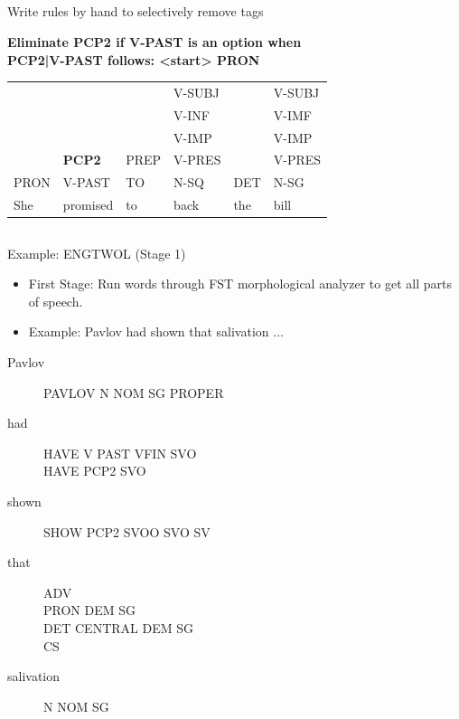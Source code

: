 \documentclass[9pt,xcolor=pdftex,dvipsnames,table]{beamer}
\begin{document}
\subsection{}
\begin{frame}{Write rules by hand to selectively remove tags}

\begin{center}
{\large \textbf{Eliminate PCP2 if V-PAST is an option when\\PCP2|V-PAST follows: <start> PRON}}

\vspace{.5cm}

\begin{tabular}{l l l l l l}
     &          &      & V-SUBJ &     & V-SUBJ \\
     &          &      & V-INF  &     & V-IMF \\
     &          &      & V-IMP  &     & V-IMP \\
     & \textbf{PCP2}     & PREP & V-PRES &     & V-PRES \\
PRON & V-PAST   & TO   & N-SQ   & DET & N-SG \\\hline
She  & promised & to   & back   & the & bill\\
\end{tabular}
\end{center}
\end{frame}

\subsection{}
\begin{frame}{Example: ENGTWOL (Stage 1)}

	\begin{itemize}
		\item First Stage: Run words through FST morphological analyzer to get all parts of speech.
		\item Example: Pavlov had shown that salivation ...
	\end{itemize}
	
	\vspace{.25cm}
	
	\begin{description}
		\item[Pavlov] PAVLOV N NOM SG PROPER
		\item[had] HAVE V PAST VFIN SVO\\HAVE PCP2 SVO
		\item[shown] SHOW PCP2 SVOO SVO SV
		\item[that] ADV\\PRON DEM SG\\DET CENTRAL DEM SG\\CS
		\item[salivation] N NOM SG
	\end{description}
\end{frame}
\end{document}

